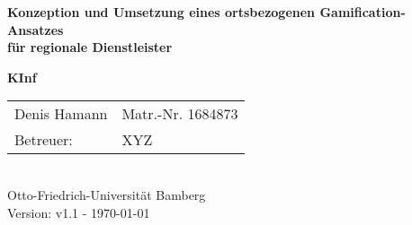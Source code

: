\begin{titlepage}

{\sffamily
\vspace*{2cm}
\begin{center}
	\bfseries
	\LARGE {Konzeption und Umsetzung eines ortsbezogenen Gamification-Ansatzes\\
	für regionale Dienstleister}
\end{center}
\vspace{1cm}
\begin{center}

	{\Large\bfseries KInf\\[5mm]}

	\begin{tabular}{ll}
		Denis Hamann & Matr.-Nr. 1684873 \\[3mm]
		
		Betreuer: & XYZ\\[3mm]


	\end{tabular}\\[0.5cm]
	
{\scriptsize Otto-Friedrich-Universität Bamberg} \\[21pt]


{\footnotesize Version: v1.1 - \today }



\end{center}
}
\end{titlepage}
